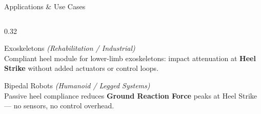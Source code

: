 \begin{frame}{Applications \& Use Cases}
\begin{columns}[T]
\begin{column}{0.32\textwidth}
            \begin{block}{\small Exoskeletons}
                \footnotesize \textit{(Rehabilitation / Industrial)}\\[0.2em]
                Compliant heel module for lower-limb exoskeletons: impact attenuation at \textbf{Heel Strike} without added actuators or control loops.
            \end{block}

            \vspace{0.15cm}

            \begin{block}{\small Bipedal Robots}
                \footnotesize \textit{(Humanoid / Legged Systems)}\\[0.2em]
                Passive heel compliance reduces \textbf{Ground Reaction Force} peaks at Heel Strike — no sensors, no control overhead.
            \end{block}

        \end{column}

    \end{columns}

    \vspace{0.15cm}
    \centering

\end{frame}
